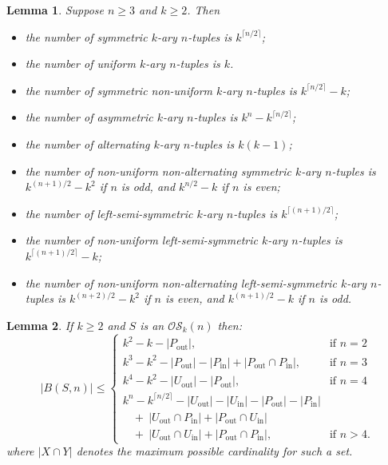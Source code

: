 \documentclass[10pt,a4paper]{amsart}
\newtheorem{lemma}{Lemma}
\begin{document}
\begin{lemma}  \label{lemma:tuple_numbers}
Suppose $n\geq3$ and $k\geq2$.  Then
\begin{itemize}
\item[i)] the number of symmetric $k$-ary $n$-tuples is $k^{\lceil n/2\rceil}$;
\item[ii)] the number of uniform $k$-ary $n$-tuples is $k$.
\item[iii)] the number of symmetric non-uniform $k$-ary $n$-tuples is $k^{\lceil n/2\rceil}-k$;
\item[iv)] the number of asymmetric $k$-ary $n$-tuples is $k^n-k^{\lceil n/2\rceil}$;
\item[v)] the number of alternating $k$-ary $n$-tuples is $k(k-1)$;
\item[vi)]  the number of non-uniform non-alternating symmetric $k$-ary $n$-tuples is
    $k^{(n+1)/2}-k^2$ if $n$ is odd, and $k^{n/2}-k$ if $n$ is even;
\item[vii)] the number of left-semi-symmetric $k$-ary $n$-tuples is $k^{\lceil(n+1)/2\rceil}$;
\item[viii)] the number of non-uniform left-semi-symmetric $k$-ary $n$-tuples is
    $k^{\lceil(n+1)/2\rceil}-k$;
\item[ix)] the number of non-uniform non-alternating left-semi-symmetric $k$-ary $n$-tuples is
    $k^{(n+2)/2}-k^2$ if $n$ is even, and $k^{(n+1)/2}-k$ if $n$ is odd.
\end{itemize}
\end{lemma}

\begin{lemma}  \label{lemma:bounds-high-level}
If $k\geq2$ and $S$ is an $\mathcal{OS}_k(n)$ then:
\[ |B(S,n)|\leq \begin{cases}
k^2-k - |P_{\text{out}}|,
 & \text{if $n=2$} \\
k^3-k^2 - |P_{\text{out}}|-|P_{\text{in}}| + |P_{\text{out}}\cap P_{\text{in}}|,
 & \text{if $n=3$} \\
k^4-k^2 - |U_{\text{out}}|-|P_{\text{out}}|,
 & \text{if $n=4$} \\
k^n-k^{\lceil n/2\rceil} - |U_{\text{out}}|-|U_{\text{in}}|-|P_{\text{out}}|-|P_{\text{in}}| \\
~~~~+~|U_{\text{out}}\cap P_{\text{in}}|+|P_{\text{out}}\cap U_{\text{in}}| \\
~~~~+~|U_{\text{out}}\cap U_{\text{in}}|+|P_{\text{out}}\cap P_{\text{in}}|,
 & \text{if $n>4$.}
\end{cases} \]
where $|X\cap Y|$ denotes the maximum possible cardinality for such a set.
\end{lemma}
\end{document}
